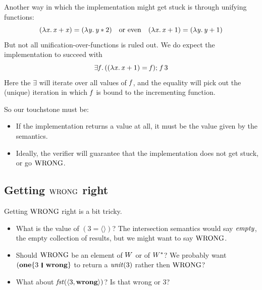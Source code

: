 Another way in which the implementation might get stuck is through unifying functions:
$$
(\lambda\mathit{x}.\,\mathit{x}\mathbin{+}\mathit{x})\mathrel{=}(\lambda\mathit{y}.\,\mathit{y}\mathbin{*}\mathrm{2})
\quad \text{or even} \quad
(\lambda\mathit{x}.\,\mathit{x}\mathbin{+}\mathrm{1})\mathrel{=}(\lambda\mathit{y}.\,\mathit{y}\mathbin{+}\mathrm{1})
$$
But not all unification-over-functions is ruled out.  We do expect the implementation to succeed with
$$
\exists\mathit{f}.\,((\lambda\mathit{x}.\,\mathit{x}\mathbin{+}\mathrm{1})\mathrel{=}\mathit{f});\,\mathit{f}\,\mathrm{3}
$$
Here the \ensuremath{\exists} will iterate over all values of \ensuremath{\Varid{f}}, and the equality will pick out the (unique) iteration
in which \ensuremath{\Varid{f}} is bound to the incrementing function.

So our touchstone must be:
\begin{itemize}
\item If the implementation returns a value at all, it must be the value given by the semantics.
\item Ideally, the verifier will guarantee that the implementation does not get stuck, or go $\mathrm{WRONG}$.
\end{itemize}


\subsection{Getting $\mathrm{WRONG}$ right}

Getting $\mathrm{WRONG}$ right is a bit tricky.

\begin{itemize}
\item What is the value of \ensuremath{(\mathrm{3}\mathrel{=}\langle\rangle)}?  The intersection semantics would say $\mathit{empty}$, the empty collection
  of results, but we might want to say $\mathrm{WRONG}$.
\item Should $\mathrm{WRONG}$ be an element of $W$ or of $W^{*}$?  We probably want \ensuremath{(\textbf{one}\{\mathrm{3}\hspace{1mm}\mathop{\rule[-0.3mm]{0.5mm}{2.5mm}}\hspace{1mm}\textbf{wrong}\}}
  to return a $\mathit{unit}(3)$ rather then $\mathrm{WRONG}$?
\item What about \ensuremath{\Varid{fst}(\langle{}\mathrm{3},\textbf{wrong}\rangle)}?  Is that wrong or 3?
\end{itemize}

